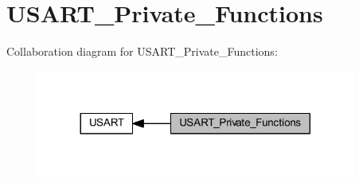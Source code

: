 \hypertarget{group___u_s_a_r_t___private___functions}{}\section{U\+S\+A\+R\+T\+\_\+\+Private\+\_\+\+Functions}
\label{group___u_s_a_r_t___private___functions}
Collaboration diagram for U\+S\+A\+R\+T\+\_\+\+Private\+\_\+\+Functions\+:
\nopagebreak
\begin{figure}[H]
\begin{center}
\leavevmode
\includegraphics[width=296pt]{group___u_s_a_r_t___private___functions}
\end{center}
\end{figure}
